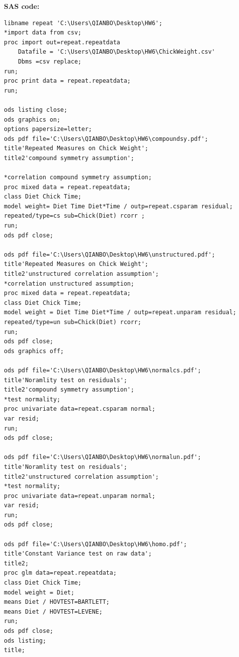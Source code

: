 \documentclass[10pt,letterpaper]{article}
\begin{document}
\newpage
\textbf{SAS code: }
\begin{lstlisting}[language=SAS]
libname repeat 'C:\Users\QIANBO\Desktop\HW6';
*import data from csv;
proc import out=repeat.repeatdata
    Datafile = 'C:\Users\QIANBO\Desktop\HW6\ChickWeight.csv'
    Dbms =csv replace;
run;
proc print data = repeat.repeatdata;
run;

ods listing close;
ods graphics on;
options papersize=letter;
ods pdf file='C:\Users\QIANBO\Desktop\HW6\compoundsy.pdf';
title'Repeated Measures on Chick Weight';
title2'compound symmetry assumption';

*correlation compound symmetry assumption;
proc mixed data = repeat.repeatdata;
class Diet Chick Time;
model weight= Diet Time Diet*Time / outp=repeat.csparam residual;
repeated/type=cs sub=Chick(Diet) rcorr ;
run;
ods pdf close;

ods pdf file='C:\Users\QIANBO\Desktop\HW6\unstructured.pdf';
title'Repeated Measures on Chick Weight';
title2'unstructured correlation assumption';
*correlation unstructured assumption;
proc mixed data = repeat.repeatdata;
class Diet Chick Time;
model weight = Diet Time Diet*Time / outp=repeat.unparam residual;
repeated/type=un sub=Chick(Diet) rcorr;
run;
ods pdf close;
ods graphics off;

ods pdf file='C:\Users\QIANBO\Desktop\HW6\normalcs.pdf';
title'Noramlity test on residuals';
title2'compound symmetry assumption';
*test normality;
proc univariate data=repeat.csparam normal; 
var resid;
run;
ods pdf close;

ods pdf file='C:\Users\QIANBO\Desktop\HW6\normalun.pdf';
title'Noramlity test on residuals';
title2'unstructured correlation assumption';
*test normality;
proc univariate data=repeat.unparam normal; 
var resid;
run;
ods pdf close;

ods pdf file='C:\Users\QIANBO\Desktop\HW6\homo.pdf';
title'Constant Variance test on raw data';
title2;
proc glm data=repeat.repeatdata; 
class Diet Chick Time; 
model weight = Diet;  
means Diet / HOVTEST=BARTLETT;  
means Diet / HOVTEST=LEVENE;
run;
ods pdf close;
ods listing;
title;
\end{lstlisting}
\end{document}
